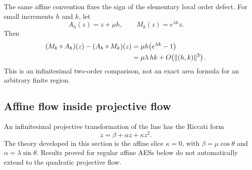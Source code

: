 The same affine convention fixes the sign of the elementary local order defect.
For small increments \(h\) and \(k\), let
\[
 A_h(z)=z+\mu h,
 \qquad
 M_k(z)=e^{\lambda k}z.
\]
Then
\begin{align}
 (M_k\circ A_h)(z)-(A_h\circ M_k)(z)
 &=\mu h\bigl(e^{\lambda k}-1\bigr)\notag\\
 &=\mu\lambda\,hk+O\!\left(\lVert(h,k)\rVert^3\right).
 \label{eq:infinitesimal-order-defect}
\end{align}
This is an infinitesimal two-order comparison, not an exact area formula for an
arbitrary finite region.

\subsection{Affine flow inside projective flow}

An infinitesimal projective transformation of the line has the Riccati form
\[
 \dot z=\beta+\alpha z+\kappa z^2.
\]
The theory developed in this section is the affine slice \(\kappa=0\), with
\(\beta=\mu\cos\theta\) and \(\alpha=\lambda\sin\theta\).  Results proved for
regular affine AESs below do not automatically extend to the quadratic projective
flow.
